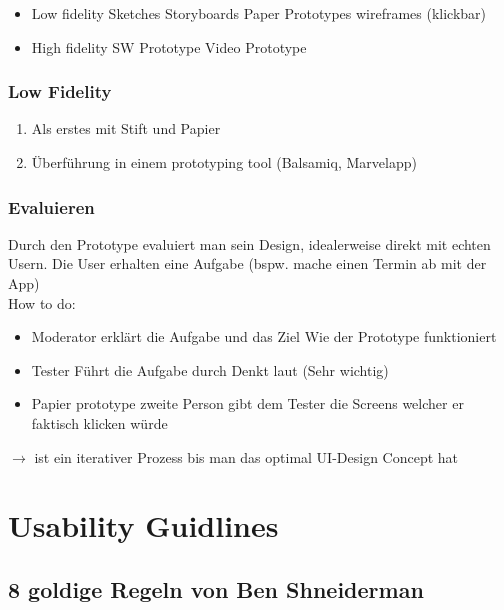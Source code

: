 \documentclass{report}
\theoremstyle{definition}
\theoremstyle{example}
\begin{document}
\begin{itemize}
   \item Low fidelity
   \subitem Sketches
   \subitem Storyboards
   \subitem Paper Prototypes
   \subitem wireframes (klickbar) 
   \item High fidelity
   \subitem SW Prototype
   \subitem Video Prototype
\end{itemize}

\subsection{Low Fidelity}
\begin{enumerate}
   \item Als erstes mit Stift und Papier
   \item Überführung in einem prototyping tool (Balsamiq, Marvelapp)
\end{enumerate}

\subsection{Evaluieren}
Durch den Prototype evaluiert man sein Design, idealerweise direkt mit echten Usern. Die User erhalten eine Aufgabe (bspw. mache einen Termin ab mit der App)\\
How to do:
\begin{itemize}
   \item Moderator erklärt
   \subitem die Aufgabe und das Ziel 
   \subitem Wie der Prototype funktioniert
   \item Tester
   \subitem Führt die Aufgabe durch
   \subitem Denkt laut (Sehr wichtig)
   \item Papier prototype 
   \subitem zweite Person gibt dem Tester die Screens welcher er faktisch klicken würde
\end{itemize}
$\rightarrow$ ist ein iterativer Prozess bis man das optimal UI-Design Concept hat

\chapter{Usability Guidlines}

\section{8 goldige Regeln von Ben Shneiderman}
\end{document}
